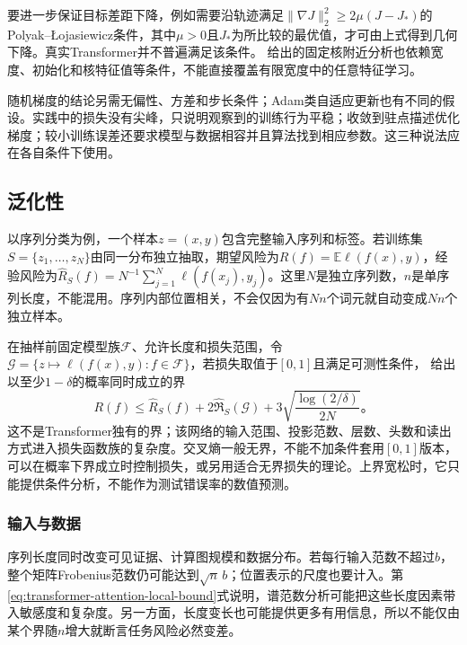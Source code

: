 要进一步保证目标差距下降，例如需要沿轨迹满足$\lVert\nabla J\rVert_2^2\geq2\mu(J-J_*)$的Polyak--Łojasiewicz条件，其中$\mu>0$且$J_*$为所比较的最优值，才可由上式得到几何下降。真实Transformer并不普遍满足该条件。
给出的固定核附近分析也依赖宽度、初始化和核特征值等条件，不能直接覆盖有限宽度中的任意特征学习。

随机梯度的结论另需无偏性、方差和步长条件；Adam类自适应更新也有不同的假设。实践中的损失没有尖峰，只说明观察到的训练行为平稳；收敛到驻点描述优化梯度；较小训练误差还要求模型与数据相容并且算法找到相应参数。这三种说法应在各自条件下使用。

\subsection{泛化性}
\label{sec:transformer-model-generalization}

以序列分类为例，一个样本$z=(x,y)$包含完整输入序列和标签。若训练集$S=\{z_1,\ldots,z_N\}$由同一分布独立抽取，期望风险为$R(f)=\mathbb E\ell(f(x),y)$，经验风险为$\widehat R_S(f)=N^{-1}\sum_{j=1}^N\ell(f(x_j),y_j)$。这里$N$是独立序列数，$n$是单序列长度，不能混用。序列内部位置相关，不会仅因为有$Nn$个词元就自动变成$Nn$个独立样本。

在抽样前固定模型族$\mathcal F$、允许长度和损失范围，令$\mathcal G=\{z\mapsto\ell(f(x),y):f\in\mathcal F\}$，若损失取值于$[0,1]$且满足可测性条件，
给出以至少$1-\delta$的概率同时成立的界
\begin{equation}
  R(f)\leq\widehat R_S(f)+2\widehat{\mathfrak R}_S(\mathcal G)
       +3\sqrt{\frac{\log(2/\delta)}{2N}}\text{。}
  \label{eq:transformer-generalization-bound}
\end{equation}
这不是Transformer独有的界；该网络的输入范围、投影范数、层数、头数和读出方式进入损失函数族的复杂度。交叉熵一般无界，不能不加条件套用$[0,1]$版本，可以在概率下界成立时控制损失，或另用适合无界损失的理论。上界宽松时，它只能提供条件分析，不能作为测试错误率的数值预测。

\subsubsection{输入与数据}

序列长度同时改变可见证据、计算图规模和数据分布。若每行输入范数不超过$b$，整个矩阵Frobenius范数仍可能达到$\sqrt n\,b$；位置表示的尺度也要计入。第\ref{eq:transformer-attention-local-bound}式说明，谱范数分析可能把这些长度因素带入敏感度和复杂度。另一方面，长度变长也可能提供更多有用信息，所以不能仅由某个界随$n$增大就断言任务风险必然变差。

